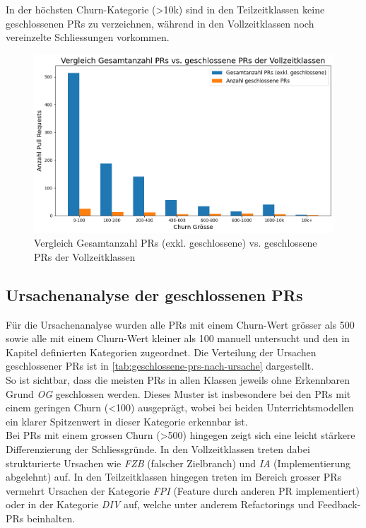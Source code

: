In der höchsten Churn-Kategorie (>10k) sind in den Teilzeitklassen keine geschlossenen PRs zu verzeichnen, während in den Vollzeitklassen noch vereinzelte Schliessungen vorkommen. 

\begin{figure}[htbp]
    \includegraphics[width=\textwidth]{Figures/vergleich-gesamtanzahl-prs-vs-closed-vollzeit.png}
    \caption{Vergleich Gesamtanzahl PRs (exkl. geschlossene) vs. geschlossene PRs der Vollzeitklassen}
    \label{fig:vergleich-gesamtanzahl-prs-vs-closed-vollzeit}
\end{figure}


\pagebreak
\subsection{Ursachenanalyse der geschlossenen PRs}
Für die Ursachenanalyse wurden alle PRs mit einem Churn-Wert grösser als 500 sowie alle mit einem Churn-Wert kleiner als 100 manuell untersucht und den in Kapitel  definierten Kategorien zugeordnet. 
Die Verteilung der Ursachen geschlossener PRs ist in \autoref{tab:geschlossene-prs-nach-ursache} dargestellt. \\
So ist sichtbar, dass die meisten PRs in allen Klassen jeweils ohne Erkennbaren Grund \textit{OG} geschlossen werden. Dieses Muster ist insbesondere bei den PRs mit einem geringen Churn (<100) ausgeprägt, wobei bei beiden Unterrichtsmodellen ein klarer Spitzenwert in dieser Kategorie erkennbar ist. \\
Bei PRs mit einem grossen Churn (>500) hingegen zeigt sich eine leicht stärkere Differenzierung der Schliessgründe.
In den Vollzeitklassen treten dabei strukturierte Ursachen wie \textit{FZB} (falscher Zielbranch) und \textit{IA} (Implementierung abgelehnt) auf. 
In den Teilzeitklassen hingegen treten im Bereich grosser PRs vermehrt Ursachen der Kategorie \textit{FPI} (Feature durch anderen PR implementiert) oder in der Kategorie \textit{DIV} auf, welche unter anderem Refactorings und Feedback-PRs beinhalten.



